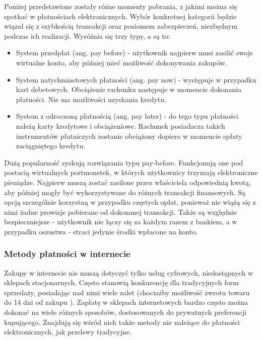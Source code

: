 Poniżej przedstawione zostały różne momenty pobrania, z jakimi można się 
spotkać w płatnościach elektronicznych. Wybór konkretnej kategorii będzie 
wiązał się z szybkością transakcji oraz poziomem zabezpieczeń, niezbędnym 
podczas ich realizacji. Wyróżnia się trzy typy, a są to:

\begin{itemize}
	\item System przedpłat (ang. pay before) - użytkownik najpierw musi zasilić 
	swoje wirtualne konto, aby później mieć możliwość dokonywania zakupów.
	\item System natychmiastowych płatności (ang. pay now) - występuje w 
	przypadku kart debetowych. Obciążenie rachunku następuje w momencie 
	dokonania płatności. Nie ma możliwości uzyskania kredytu.
	\item System z odroczoną płatnością (ang. pay later) - do tego typu 
	płatności należą karty kredytowe i obciążeniowe. Rachunek posiadacza takich 
	instrumentów płatniczych zostanie obciążony dopiero w momencie spłaty 
	zaciągniętego kredytu.
\end{itemize}

Dużą popularność zyskują rozwiązania typu pay-before. Funkcjonują one pod 
postacią wirtualnych portmonetek, w których użytkownicy trzymają elektroniczne 
pieniądze. Najpierw muszą zostać zasilone przez właściciela odpowiednią kwotą, 
aby później mogły być wykorzystywane do różnych transakcji finansowych. 
Są opcją szczególnie korzystną w przypadku częstych opłat, ponieważ nie wiążą się z nimi żadne prowizje pobierane od dokonanej transakcji. Także są 
względnie bezpieczniejsze - użytkownik nie łączy się za każdym razem z bankiem, 
a w przypadku oszustwa - straci jedynie środki wpłacone na konto.

\subsubsection*{Metody płatności w internecie}

Zakupy w internecie nie muszą dotyczyć tylko usług cyfrowych, niedostępnych w  
sklepach stacjonarnych. Często stanowią konkurencję dla tradycyjnych form 
sprzedaży, posiadając nad nimi wiele zalet (chociażby możliwość zwrotu towaru 
do 14 dni od zakupu \cite{wszystko_o_platnosciach}). Zapłatę w sklepach 
internetowych bardzo często można dokonać na wiele różnych sposobów, 
dostosowanych do prywatnych preferencji kupującego. Znajdują się wśród nich 
także metody nie należące do płatności elektronicznych, jak przelewy tradycyjne.

